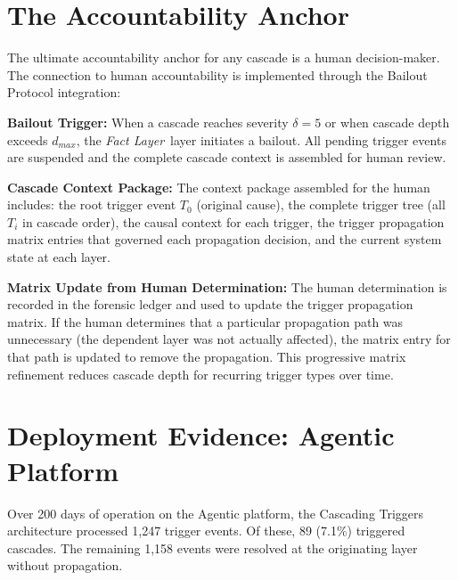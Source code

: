 \documentclass[12pt]{article}
\newcommand{\fact}{\textit{Fact Layer}}
\begin{document}
\section{The Accountability Anchor}
\label{sec:accountability}

The ultimate accountability anchor for any cascade is a human decision-maker. The connection to human accountability is implemented through the Bailout Protocol integration:

\medskip\noindent\textbf{Bailout Trigger:} When a cascade reaches severity $\delta = 5$ or when cascade depth exceeds $d_{max}$, the \fact\ layer initiates a bailout. All pending trigger events are suspended and the complete cascade context is assembled for human review.

\medskip\noindent\textbf{Cascade Context Package:} The context package assembled for the human includes: the root trigger event $T_0$ (original cause), the complete trigger tree (all $T_i$ in cascade order), the causal context for each trigger, the trigger propagation matrix entries that governed each propagation decision, and the current system state at each layer.

\medskip\noindent\textbf{Matrix Update from Human Determination:} The human determination is recorded in the forensic ledger and used to update the trigger propagation matrix. If the human determines that a particular propagation path was unnecessary (the dependent layer was not actually affected), the matrix entry for that path is updated to remove the propagation. This progressive matrix refinement reduces cascade depth for recurring trigger types over time.

\section{Deployment Evidence: Agentic Platform}
\label{sec:deployment}

Over 200 days of operation on the Agentic platform, the Cascading Triggers architecture processed 1,247 trigger events. Of these, 89 (7.1\%) triggered cascades. The remaining 1,158 events were resolved at the originating layer without propagation.
\end{document}
